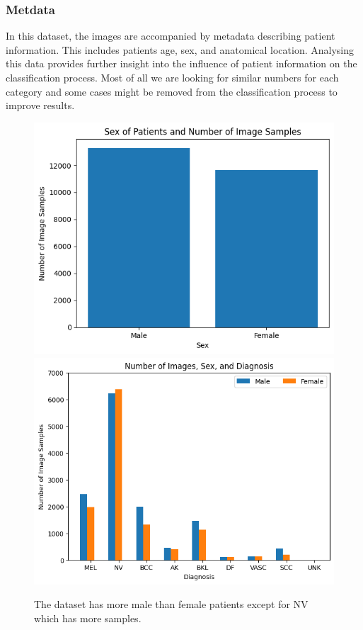 \subsubsection{Metdata}
In this dataset, the images are accompanied by metadata describing patient information. This includes patients age, sex, and anatomical location. Analysing this data provides further insight into the influence of patient information on the classification process. Most of all we are looking for similar numbers for each category and some cases might be removed from the classification process to improve results.

\begin{figure}
	\centering
	\includegraphics[scale=0.8]{images/ISIC/sex-number.png}
	\includegraphics[scale=0.8]{images/ISIC/number-sex-diagnosis.png}
	\caption{The dataset has more male than female patients except for NV which has more samples.} 
\end{figure} \label{sex}

